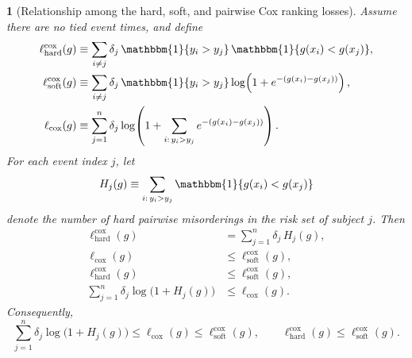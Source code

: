 \documentclass[11pt]{article}
\theoremstyle{plain}
\theoremstyle{plain}
\theoremstyle{plain}
\newtheorem{proposition}{\protect\propositionname}
\theoremstyle{plain}
\theoremstyle{plain}
\theoremstyle{plain}
\theoremstyle{plain}
\providecommand{\propositionname}{Proposition}
\begin{document}
\begin{proposition}[Relationship among the hard, soft, and pairwise Cox ranking losses]
\label{prop:cox_loss_relationships}
Assume there are no tied event times, and define
\begin{align}
\ell_{\mathrm{hard}}^{\mathrm{cox}}(g)
&\equiv
\sum_{i\ne j}
\delta_j\,\mathbbm{1}\{y_i>y_j\}\,\mathbbm{1}\{g(x_i)<g(x_j)\},
\label{eq:cox_hard_loss_prop}
\\
\ell_{\mathrm{soft}}^{\mathrm{cox}}(g)
&\equiv
\sum_{i\ne j}
\delta_j\,\mathbbm{1}\{y_i>y_j\}
\log\!\left(1+e^{-(g(x_i)-g(x_j))}\right),
\label{eq:cox_soft_loss_prop}
\\
\ell_{\mathrm{cox}}(g)
&\equiv
\sum_{j=1}^n
\delta_j
\log\!\left(
1+\sum_{i:\,y_i>y_j} e^{-(g(x_i)-g(x_j))}
\right).
\label{eq:cox_listwise_loss_prop}
\end{align}
For each event index \(j\), let
\begin{equation}
\label{eq:Hj_def_prop}
H_j(g)
\equiv
\sum_{i:\,y_i>y_j}\mathbbm{1}\{g(x_i)<g(x_j)\}
\end{equation}
denote the number of hard pairwise misorderings in the risk set of subject \(j\). Then
\begin{align}
\ell_{\mathrm{hard}}^{\mathrm{cox}}(g)
&=
\sum_{j=1}^n \delta_j\,H_j(g),
\label{eq:hard_decomp_prop}
\\
\ell_{\mathrm{cox}}(g)
&\le
\ell_{\mathrm{soft}}^{\mathrm{cox}}(g),
\label{eq:cox_soft_upper_prop}
\\
\ell_{\mathrm{hard}}^{\mathrm{cox}}(g)
&\le
\ell_{\mathrm{soft}}^{\mathrm{cox}}(g),
\label{eq:hard_soft_upper_prop}
\\
\sum_{j=1}^n \delta_j \log\!\big(1+H_j(g)\big)
&\le
\ell_{\mathrm{cox}}(g).
\label{eq:cox_hard_lower_prop}
\end{align}
Consequently,
\begin{equation}
\label{eq:cox_sandwich_prop}
\sum_{j=1}^n \delta_j \log\!\big(1+H_j(g)\big)
\le
\ell_{\mathrm{cox}}(g)
\le
\ell_{\mathrm{soft}}^{\mathrm{cox}}(g),
\qquad
\ell_{\mathrm{hard}}^{\mathrm{cox}}(g)
\le
\ell_{\mathrm{soft}}^{\mathrm{cox}}(g).
\end{equation}
\end{proposition}
\end{document}
